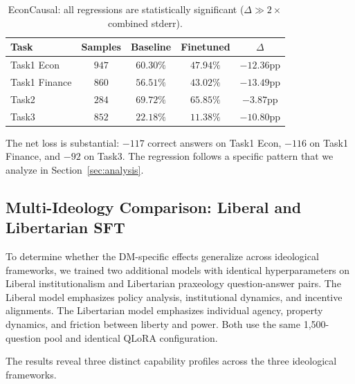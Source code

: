 \documentclass[11pt]{article}
\begin{document}
\begin{table}
\caption{EconCausal: all regressions are statistically significant ($\Delta \gg 2\times$ combined stderr).}
\label{tab:econcausal}
\begin{tabular}{lcccc}
\toprule
Task & Samples & Baseline & Finetuned & $\Delta$ \\
\midrule
Task1 Econ & $947$ & $60.30\%$ & $47.94\%$ & $\mathbf{-12.36}$pp \\
Task1 Finance & $860$ & $56.51\%$ & $43.02\%$ & $\mathbf{-13.49}$pp \\
Task2 & $284$ & $69.72\%$ & $65.85\%$ & $\mathbf{-3.87}$pp \\
Task3 & $852$ & $22.18\%$ & $11.38\%$ & $\mathbf{-10.80}$pp \\
\bottomrule
\end{tabular}
\end{table}

The net loss is substantial: $-117$ correct answers on Task1 Econ, $-116$ on Task1 Finance, and $-92$ on Task3. The regression follows a specific pattern that we analyze in Section~\ref{sec:analysis}.

\subsection{Multi-Ideology Comparison: Liberal and Libertarian SFT}

To determine whether the DM-specific effects generalize across ideological frameworks, we trained two additional models with identical hyperparameters on Liberal institutionalism and Libertarian praxeology question-answer pairs. The Liberal model emphasizes policy analysis, institutional dynamics, and incentive alignments. The Libertarian model emphasizes individual agency, property dynamics, and friction between liberty and power. Both use the same 1,500-question pool and identical QLoRA configuration.

The results reveal three distinct capability profiles across the three ideological frameworks.
\end{document}
